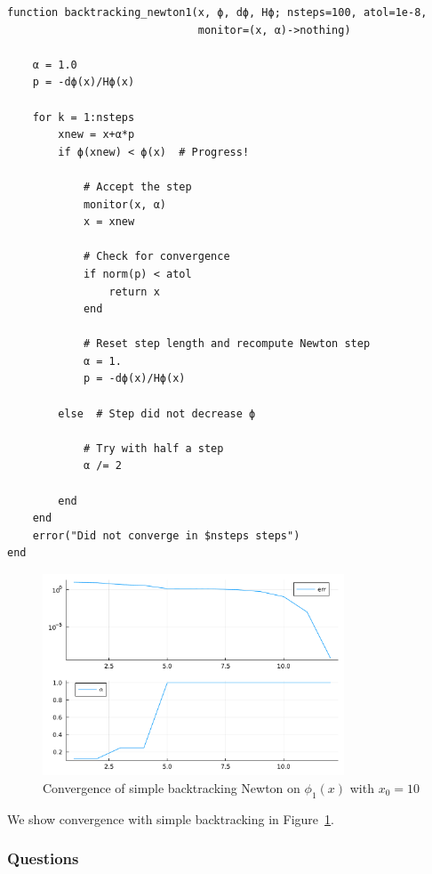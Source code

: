 \documentclass[12pt, leqno]{article} %
\begin{document}
\begin{verbatim}
function backtracking_newton1(x, ϕ, dϕ, Hϕ; nsteps=100, atol=1e-8,
                              monitor=(x, α)->nothing)

    α = 1.0
    p = -dϕ(x)/Hϕ(x)
    
    for k = 1:nsteps
        xnew = x+α*p
        if ϕ(xnew) < ϕ(x)  # Progress!

            # Accept the step
            monitor(x, α)
            x = xnew

            # Check for convergence
            if norm(p) < atol
                return x
            end
            
            # Reset step length and recompute Newton step
            α = 1.
            p = -dϕ(x)/Hϕ(x)

        else  # Step did not decrease ϕ

            # Try with half a step
            α /= 2

        end
    end
    error("Did not converge in $nsteps steps")
end
\end{verbatim}

\begin{figure}
\begin{center}
  \includegraphics[width=0.8\textwidth]{fig/2023-04-17-phi1-newton-bt.pdf}
\end{center}
\caption{Convergence of simple backtracking Newton on $\phi_1(x)$ with $x_0 = 10$}
\label{fig:phi1-newton-bt}
\end{figure}

We show convergence with simple backtracking in Figure~\ref{fig:phi1-newton-bt}.

\subsubsection{Questions}
\end{document}
